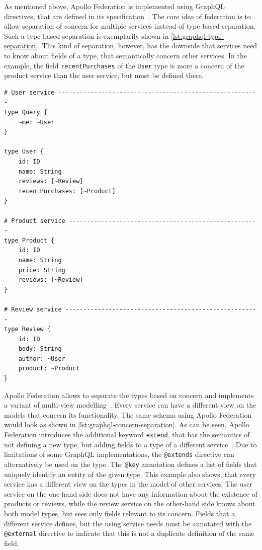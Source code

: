 As mentioned above, Apollo Federation is implemented using GraphQL directives, that are defined in its specification~\cite{MDGa}.
The core idea of federation is to allow separation of concern for multiple services instead of type-based separation.
Such a type-based separation is exemplarily shown in \autoref{lst:graphql-type-separation}.
This kind of separation, however, has the downside that services need to know about fields of a type, that semantically concern other services.
In the example, the field \texttt{recentPurchases} of the \texttt{User} type is more a concern of the product service than the user service, but must be defined there.

\begin{lstlisting}[language=graphqls, caption={Type-based Separation in GraphQL Schemas~\cite{MDG}}, label={lst:graphql-type-separation}]
# User service --------------------------------------------------------
type Query {
    ~me: ~User
}

type User {
    id: ID
    name: String
    reviews: [~Review]
    recentPurchases: [~Product]
}

# Product service -----------------------------------------------------
type Product {
    id: ID
    name: String
    price: String
    reviews: [~Review]
}

# Review service ------------------------------------------------------
type Review {
    id: ID
    body: String
    author: ~User
    product: ~Product
}
\end{lstlisting}

Apollo Federation allows to separate the types based on concern and implements a variant of multi-view modelling~\cite{MDG, Stuenkel2020}.
Every service can have a different view on the models that concern its functionality.
The same schema using Apollo Federation would look as shown in \autoref{lst:graphql-concern-separation}.
As can be seen, Apollo Federation introduces the additional keyword \texttt{extend}, that has the semantics of not defining a new type, but adding fields to a type of a different service~\cite{MDG}.
Due to limitations of some GraphQL implementations, the \texttt{@extends} directive can alternatively be used on the type.
The \texttt{@key} annotation defines a list of fields that uniquely identify an entity of the given type.
This example also shows, that every service has a different view on the types in the model of other services.
The user service on the one-hand side does not have any information about the existence of products or reviews, while the review service on the other-hand side knows about both model types, but sees only fields relevant to its concern.
Fields that a different service defines, but the using service needs must be annotated with the \texttt{@external} directive to indicate that this is not a duplicate definition of the same field.


